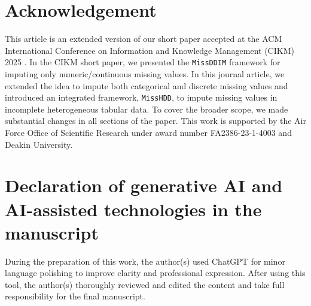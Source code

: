 \documentclass[times, review, 10pt]{elsarticle}
\begin{document}
\section*{Acknowledgement}

This article is an extended version of our short paper accepted at the ACM International Conference on Information and Knowledge Management (CIKM) 2025 \cite{missddim}. In the CIKM short paper, we presented the {\tt MissDDIM} framework for imputing only numeric/continuous missing values. In this journal article, we extended the idea to impute both categorical and discrete missing values and introduced an integrated framework, {\tt MissHDD}, to impute missing values in incomplete heterogeneous tabular data. To cover the broader scope, we made substantial changes in all sections of the paper.     
This work is supported by the Air Force Office of Scientific Research under award number FA2386-23-1-4003 and Deakin University.

\section*{Declaration of generative AI and AI-assisted technologies in the manuscript}
During the preparation of this work, the author(s) used ChatGPT for minor language polishing to improve clarity and professional expression. After using this tool, the author(s) thoroughly reviewed and edited the content and take full responsibility for the final manuscript.



\end{document}
